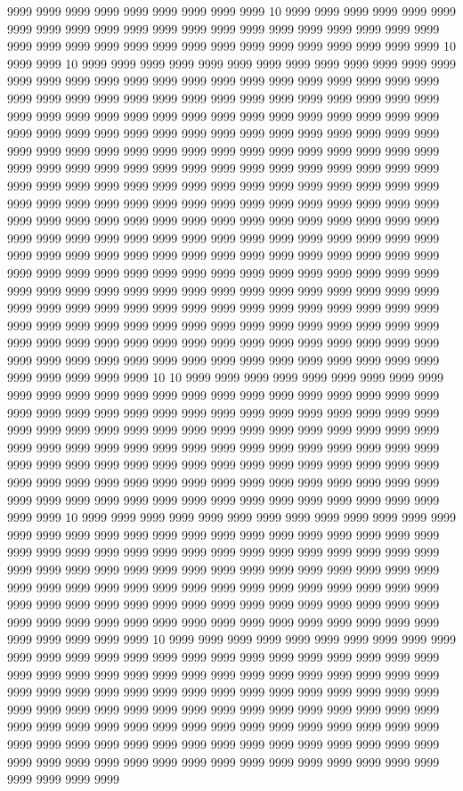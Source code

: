 9999 9999 9999 9999 9999 9999 9999 9999 9999 10 9999 9999 9999 9999 9999 9999 9999 9999 9999 9999 9999 9999 9999 9999 9999 9999 9999 9999 9999 9999 9999 9999 9999 9999 9999 9999 9999 9999 9999 9999 9999 9999 9999 9999 9999 9999 10 9999 9999 10 9999 9999 9999 9999 9999 9999 9999 9999 9999 9999 9999 9999 9999 9999 9999 9999 9999 9999 9999 9999 9999 9999 9999 9999 9999 9999 9999 9999 9999 9999 9999 9999 9999 9999 9999 9999 9999 9999 9999 9999 9999 9999 9999 9999 9999 9999 9999 9999 9999 9999 9999 9999 9999 9999 9999 9999 9999 9999 9999 9999 9999 9999 9999 9999 9999 9999 9999 9999 9999 9999 9999 9999 9999 9999 9999 9999 9999 9999 9999 9999 9999 9999 9999 9999 9999 9999 9999 9999 9999 9999 9999 9999 9999 9999 9999 9999 9999 9999 9999 9999 9999 9999 9999 9999 9999 9999 9999 9999 9999 9999 9999 9999 9999 9999 9999 9999 9999 9999 9999 9999 9999 9999 9999 9999 9999 9999 9999 9999 9999 9999 9999 9999 9999 9999 9999 9999 9999 9999 9999 9999 9999 9999 9999 9999 9999 9999 9999 9999 9999 9999 9999 9999 9999 9999 9999 9999 9999 9999 9999 9999 9999 9999 9999 9999 9999 9999 9999 9999 9999 9999 9999 9999 9999 9999 9999 9999 9999 9999 9999 9999 9999 9999 9999 9999 9999 9999 9999 9999 9999 9999 9999 9999 9999 9999 9999 9999 9999 9999 9999 9999 9999 9999 9999 9999 9999 9999 9999 9999 9999 9999 9999 9999 9999 9999 9999 9999 9999 9999 9999 9999 9999 9999 9999 9999 9999 9999 9999 9999 9999 9999 9999 9999 9999 9999 9999 9999 9999 9999 9999 9999 9999 9999 9999 9999 9999 9999 9999 9999 9999 9999 9999 9999 9999 9999 9999 9999 9999 9999 9999 9999 9999 9999 9999 9999 9999 9999 9999 9999 9999 9999 9999 9999 9999 10 10 9999 9999 9999 9999 9999 9999 9999 9999 9999 9999 9999 9999 9999 9999 9999 9999 9999 9999 9999 9999 9999 9999 9999 9999 9999 9999 9999 9999 9999 9999 9999 9999 9999 9999 9999 9999 9999 9999 9999 9999 9999 9999 9999 9999 9999 9999 9999 9999 9999 9999 9999 9999 9999 9999 9999 9999 9999 9999 9999 9999 9999 9999 9999 9999 9999 9999 9999 9999 9999 9999 9999 9999 9999 9999 9999 9999 9999 9999 9999 9999 9999 9999 9999 9999 9999 9999 9999 9999 9999 9999 9999 9999 9999 9999 9999 9999 9999 9999 9999 9999 9999 9999 9999 9999 9999 9999 9999 9999 9999 9999 9999 9999 9999 9999 9999 9999 10 9999 9999 9999 9999 9999 9999 9999 9999 9999 9999 9999 9999 9999 9999 9999 9999 9999 9999 9999 9999 9999 9999 9999 9999 9999 9999 9999 9999 9999 9999 9999 9999 9999 9999 9999 9999 9999 9999 9999 9999 9999 9999 9999 9999 9999 9999 9999 9999 9999 9999 9999 9999 9999 9999 9999 9999 9999 9999 9999 9999 9999 9999 9999 9999 9999 9999 9999 9999 9999 9999 9999 9999 9999 9999 9999 9999 9999 9999 9999 9999 9999 9999 9999 9999 9999 9999 9999 9999 9999 9999 9999 9999 9999 9999 9999 9999 9999 9999 9999 9999 9999 9999 9999 9999 9999 9999 9999 9999 10 9999 9999 9999 9999 9999 9999 9999 9999 9999 9999 9999 9999 9999 9999 9999 9999 9999 9999 9999 9999 9999 9999 9999 9999 9999 9999 9999 9999 9999 9999 9999 9999 9999 9999 9999 9999 9999 9999 9999 9999 9999 9999 9999 9999 9999 9999 9999 9999 9999 9999 9999 9999 9999 9999 9999 9999 9999 9999 9999 9999 9999 9999 9999 9999 9999 9999 9999 9999 9999 9999 9999 9999 9999 9999 9999 9999 9999 9999 9999 9999 9999 9999 9999 9999 9999 9999 9999 9999 9999 9999 9999 9999 9999 9999 9999 9999 9999 9999 9999 9999 9999 9999 9999 9999 9999 9999 9999 9999 9999 9999 9999 9999 9999 9999 9999 9999 9999 9999 9999 